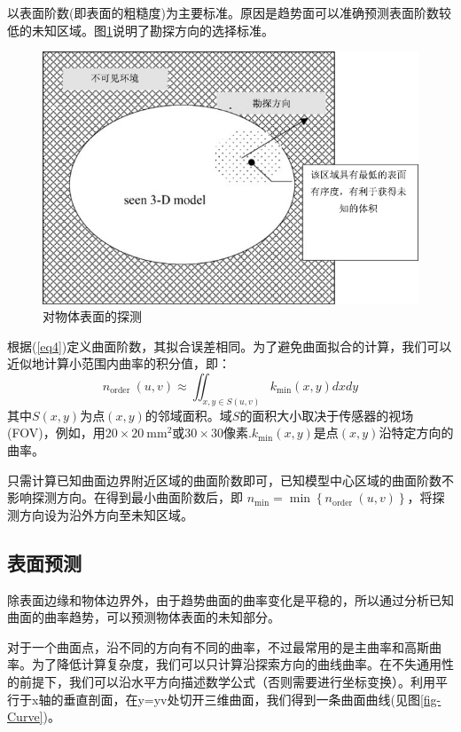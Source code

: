 \documentclass[AutoFakeBold,zihao=-4]{ctexart}
\begin{document}
	以表面阶数(即表面的粗糙度)为主要标准。原因是趋势面可以准确预测表面阶数较低的未知区域。图\ref{fig-exploration}说明了勘探方向的选择标准。
	
	\begin{figure}[h]
		\centering
		\includegraphics[scale=0.5]{PIC3}
		\caption{对物体表面的探测}
		\label{fig-exploration}
	\end{figure}

	根据(\ref{eq4})定义曲面阶数，其拟合误差相同。为了避免曲面拟合的计算，我们可以近似地计算小范围内曲率的积分值，即：
	\begin{equation}
		n_{\text {order }}(u, v) \approx \iint_{x, y \in S(u, v)} k_{\min }(x, y) d x d y
		\label{eq7}
	\end{equation}
	其中$ S(x,y) $为点$ (x,y) $的邻域面积。域$ S $的面积大小取决于传感器的视场(FOV)，例如，用$ 20 \times 20 \mathrm{~mm}^{2} $或$ 30 \times 30 $像素.$ k_{\min }(x, y) $是点$ (x,y) $沿特定方向的曲率。
	
	只需计算已知曲面边界附近区域的曲面阶数即可，已知模型中心区域的曲面阶数不影响探测方向。在得到最小曲面阶数后，即 $ n_{\min }=\min \left\{n_{\text {order }}(u, v)\right\} $，将探测方向设为沿外方向至未知区域。
	
	\subsection{表面预测}
	
	除表面边缘和物体边界外，由于趋势曲面的曲率变化是平稳的，所以通过分析已知曲面的曲率趋势，可以预测物体表面的未知部分。
	
	对于一个曲面点，沿不同的方向有不同的曲率，不过最常用的是主曲率和高斯曲率。为了降低计算复杂度，我们可以只计算沿探索方向的曲线曲率。在不失通用性的前提下，我们可以沿水平方向描述数学公式（否则需要进行坐标变换）。利用平行于x轴的垂直剖面，在y=yv处切开三维曲面，我们得到一条曲面曲线(见图\ref{fig-Curve})。
	
\end{document}
